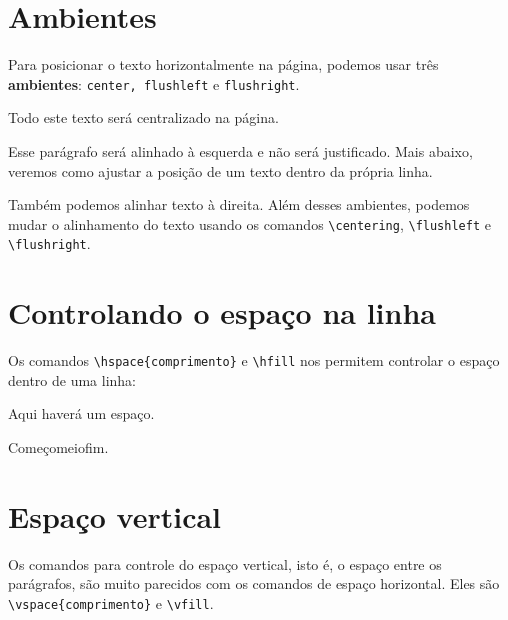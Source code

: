 \documentclass[a4paper]{article}
\begin{document}
\frenchspacing

\section{Ambientes}

Para posicionar o texto horizontalmente na página, podemos usar três
\textbf{ambientes}: \texttt{center, flushleft} e \texttt{flushright}.

\begin{center}
  Todo este texto será centralizado na página.
\end{center}

\begin{flushleft}
  Esse parágrafo será alinhado à esquerda e não será justificado. Mais abaixo,
  veremos como ajustar a posição de um texto dentro da própria linha.
\end{flushleft}

\begin{flushright}
  Também podemos alinhar texto à direita. Além desses ambientes, podemos mudar
  o alinhamento do texto usando os comandos \verb+\centering+,
  \verb+\flushleft+ e \verb+\flushright+.
\end{flushright}

\section{Controlando o espaço na linha}

Os comandos \verb+\hspace{comprimento}+ e \verb+\hfill+ nos permitem controlar
o espaço dentro de uma linha:

Aqui haverá\hspace{1.5cm} um espaço.

Começo\hfill meio\hfill fim.

\section{Espaço vertical}

Os comandos para controle do espaço vertical, isto é, o espaço entre os
parágrafos, são muito parecidos com os comandos de espaço horizontal. Eles são
\verb+\vspace{comprimento}+ e \verb+\vfill+.
\end{document}
